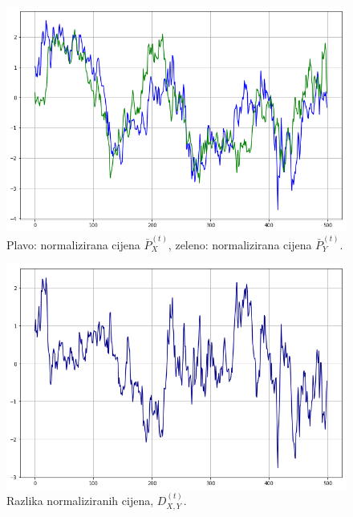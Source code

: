 \documentclass[lmodern, utf8, diplomski, numeric]{fer}
\newcommand{\norm}[1]{\bar{#1}}
\begin{document}
  \begin{figure}[p]
    \centering
    \includegraphics[width=1.0\linewidth]{graphics/ab-prices-norm.png}
    \caption{
      Plavo: normalizirana cijena $\norm{P}_X^{(t)}$, zeleno: normalizirana cijena $\norm{P}_Y^{(t)}$.
    }
    \label{fig:ab-prices-norm}
  \end{figure}

  \begin{figure}[p]
    \centering
    \includegraphics[width=1.0\linewidth]{graphics/ab-prices-norm-diff.png}
    \caption{
      Razlika normaliziranih cijena, $D_{X,Y}^{\left(t\right)}$.}
  \end{figure}
  
\end{document}
